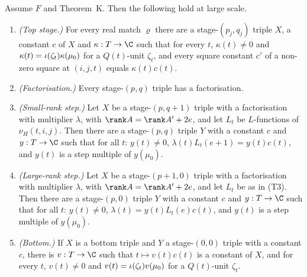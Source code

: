 \begin{proposition}\label{pf:sh-theta:five}
Assume $F$ and Theorem~K. Then the following hold at large scale.
\begin{enumerate}[label=\textup{(T\arabic*)},leftmargin=*]
\item\label{pf:sh-theta:T1} \emph{(Top stage.)} For every real match $\varrho$ there are a stage-$(p_j,q_j)$ triple $X$, a
constant $c$ of $X$ and $\kappa:T\to\C$ such that for every $t$, $\kappa(t)\ne0$ and $\kappa(t)=\iota(\zeta_t)\kappa(\mu_0)$
for a $Q(t)$-unit $\zeta_t$, and every square constant $c'$ of a non-zero square at $(i,j,t)$ equals $\kappa(t)c(t)$.
\item\label{pf:sh-theta:T2} \emph{(Factorisation.)} Every stage-$(p,q)$ triple has a factorisation.
\item\label{pf:sh-theta:T3} \emph{(Small-rank step.)} Let $X$ be a stage-$(p,q+1)$ triple with a factorisation with multiplier
$\lambda$, with $\rank A=\rank A'+2e$, and let $L_t$ be $L$-functions of $\nu_H(t,i,j)$. Then there are a stage-$(p,q)$
triple $Y$ with a constant $c$ and $y:T\to\C$ such that for all $t$: $y(t)\ne0$,
$\lambda(t)L_t(e+1)=y(t)c(t)$, and $y(t)$ is a step multiple of $y(\mu_0)$.
\item\label{pf:sh-theta:T4} \emph{(Large-rank step.)} Let $X$ be a stage-$(p+1,0)$ triple with a factorisation with multiplier
$\lambda$, with $\rank A=\rank A'+2e$, and let $L_t$ be as in (T3). Then there are a stage-$(p,0)$ triple $Y$ with a
constant $c$ and $y:T\to\C$ such that for all $t$: $y(t)\ne0$, $\lambda(t)=y(t)L_t(e)c(t)$, and $y(t)$ is a step multiple
of $y(\mu_0)$.
\item\label{pf:sh-theta:T5} \emph{(Bottom.)} If $X$ is a bottom triple and $Y$ a stage-$(0,0)$ triple with a constant $c$,
there is $v:T\to\C$ such that $t\mapsto v(t)c(t)$ is a constant of $X$, and for every $t$, $v(t)\ne0$ and
$v(t)=\iota(\zeta_t)v(\mu_0)$ for a $Q(t)$-unit $\zeta_t$.
\end{enumerate}
\end{proposition}

